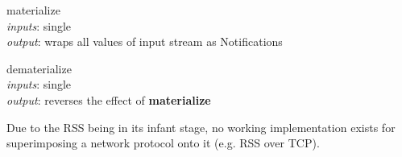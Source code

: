 \documentclass{dithesis}
\begin{document}
\begin{description}
\begin{minipage}[c]{0.4\linewidth}
\item[materialize] ~\\
	\textit{inputs}: single \\
	\textit{output}: wraps all values of input stream as Notifications
\end{minipage}
\begin{minipage}[c]{0.6\linewidth}

\end{minipage}

\begin{minipage}[c]{0.4\linewidth}
\item[dematerialize] ~\\
	\textit{inputs}: single \\
	\textit{output}: reverses the effect of \textbf{materialize}
\end{minipage}
\begin{minipage}[c]{0.6\linewidth}

\end{minipage}

\end{description}





Due to the RSS being in its infant stage, no working implementation exists for superimposing a network protocol onto it (e.g. RSS over TCP). 









\end{document}
